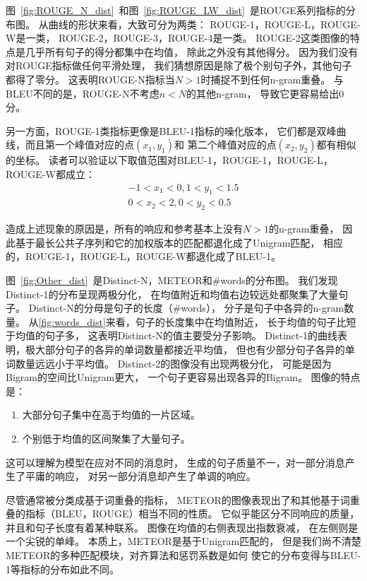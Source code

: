 
图~\ref{fig:ROUGE_N_dist}~和图~\ref{fig:ROUGE_LW_dist}~是ROUGE系列指标的分布图。
从曲线的形状来看，大致可分为两类：
ROUGE-1，ROUGE-L，ROUGE-W是一类，
ROUGE-2，ROUGE-3，ROUGE-4是一类。
ROUGE-2这类图像的特点是几乎所有句子的得分都集中在均值，
除此之外没有其他得分。
因为我们没有对ROUGE指标做任何平滑处理，
我们猜想原因是除了极个别句子外，其他句子都得了零分。
这表明ROUGE-N指标当$N > 1$时捕捉不到任何n-gram重叠。
与BLEU不同的是，ROUGE-N不考虑$n < N$的其他n-gram，
导致它更容易给出0分。

另一方面，ROUGE-1类指标更像是BLEU-1指标的噪化版本，
它们都是双峰曲线，而且第一个峰值对应的点$(x_1, y_1)$和
第二个峰值对应的点$(x_2, y_2)$都有相似的坐标。
读者可以验证以下取值范围对BLEU-1，ROUGE-1，ROUGE-L，ROUGE-W都成立：
\begin{align}
    -1 < x_1 < 0, 1 < y_1 < 1.5 \\
    0 < x_2 < 2, 0 < y_2 < 0.5
\end{align}

造成上述现象的原因是，所有的响应和参考基本上没有$N > 1$的n-gram重叠，
因此基于最长公共子序列和它的加权版本的匹配都退化成了Unigram匹配，
相应的，ROUGE-1，ROUGE-L，ROUGE-W都退化成了BLEU-1。


图~\ref{fig:Other_dist}~是Distinct-N，METEOR和\#words的分布图。
我们发现Distinct-1的分布呈现两极分化，
在均值附近和均值右边较远处都聚集了大量句子。
Distinct-N的分母是句子的长度（\#words），
分子是句子中各异的n-gram数量。
从\ref{fig:words_dist}来看，句子的长度集中在均值附近，
长于均值的句子比短于均值的句子多，
这表明Distinct-N的值主要受分子影响。
Distinct-1的曲线表明，极大部分句子的各异的单词数量都接近平均值，
但也有少部分句子各异的单词数量远远小于平均值。
Distinct-2的图像没有出现两极分化，
可能是因为Bigram的空间比Unigram更大，
一个句子更容易出现各异的Bigram。
图像的特点是：
\begin{enumerate}
    \item 大部分句子集中在高于均值的一片区域。
    \item 个别低于均值的区间聚集了大量句子。
\end{enumerate}
这可以理解为模型在应对不同的消息时，
生成的句子质量不一，对一部分消息产生了平庸的响应，
对另一部分消息却产生了单调的响应。

尽管通常被分类成基于词重叠的指标，
METEOR的图像表现出了和其他基于词重叠的指标（BLEU，ROUGE）相当不同的性质。
它似乎能区分不同响应的质量，并且和句子长度有着某种联系。
图像在均值的右侧表现出指数衰减， 在左侧则是一个尖锐的单峰。
本质上，METEOR是基于Unigram匹配的，
但是我们尚不清楚METEOR的多种匹配模块，对齐算法和惩罚系数是如何
使它的分布变得与BLEU-1等指标的分布如此不同。

